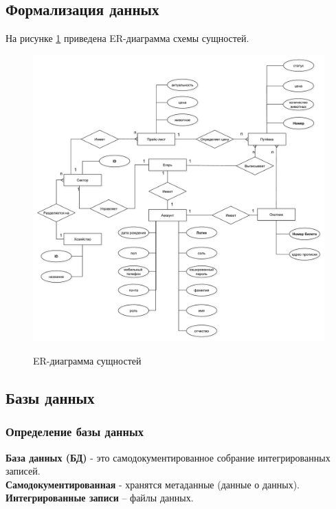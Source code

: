 	\subsection{Формализация данных}
	На рисунке \ref{fig1:image} приведена ER-диаграмма схемы сущностей.
	
	\begin{figure}[ph!]
		\centering
		\begin{center}
			{\includegraphics[scale=0.45]{schemes/er.pdf}}
			\caption{ER-диаграмма сущностей}
			\label{fig1:image}
		\end{center}
	\end{figure}

	\newpage

	\subsection{Базы данных}
	\subsubsection{Определение базы данных}
	\textbf{База данных (БД)} -  это самодокументированное собрание интегрированных записей.\\
	\textbf{Самодокументированная} - хранятся метаданные (данные о данных).\\
	\textbf{Интегрированные записи} – файлы данных.
	
